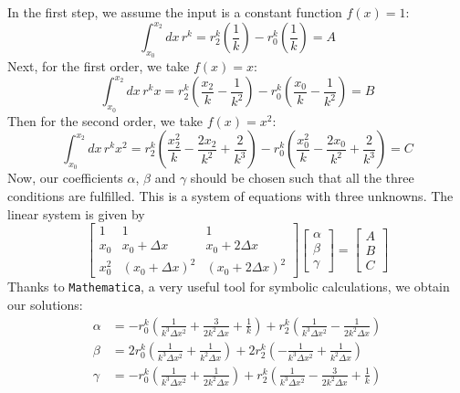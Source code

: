 In the first step, we assume the input is a constant function $f(x)=1$:
\begin{equation} \label{eq:alice}
\int_{x_0}^{x_2} dx\, r^k = r_2^k \left(\frac{1}{k}\right) - r_0^k \left(\frac{1}{k}\right) = A
\end{equation}
Next, for the first order, we take $f(x)=x$:
\begin{equation} \label{eq:bob}
\int_{x_0}^{x_2} dx\, r^k x = r_2^k\left( \frac{x_2}{k} - \frac{1}{k^2} \right) - r_0^k\left( \frac{x_0}{k} - \frac{1}{k^2} \right) = B
\end{equation}
Then for the second order, we take $f(x)=x^2$:
\begin{equation} \label{eq:chen}
\int_{x_0}^{x_2} dx\, r^k x^2 = r_2^k\left( \frac{x_2^2}{k} - \frac{2x_2}{k^2} + \frac{2}{k^3} \right) - r_0^k\left( \frac{x_0^2}{k} - \frac{2x_0}{k^2} + \frac{2}{k^3} \right) = C
\end{equation}
Now, our coefficients $\alpha$, $\beta$ and $\gamma$ should be chosen such that
all the three conditions are fulfilled. This is a system of equations with three unknowns.
The linear system is given by
\begin{equation}
\begin{bmatrix}
1 & 1 & 1 \\
x_0 & x_0+\Delta x & x_0+2\Delta x \\
x_0^2 & (x_0+\Delta x)^2 & (x_0+2\Delta x)^2
\end{bmatrix}
\begin{bmatrix}
\alpha \\
\beta \\
\gamma
\end{bmatrix} =
\begin{bmatrix}
A \\
B \\
C
\end{bmatrix}
\end{equation}
Thanks to \texttt{Mathematica}, a very useful tool for symbolic
calculations, we obtain our solutions:
\begin{align}
\alpha & = -r_0^k\left( \frac{1}{k^3\Delta x^2} + \frac{3}{2k^2\Delta x} + \frac{1}{k} \right)
           +r_2^k\left( \frac{1}{k^3\Delta x^2} - \frac{1}{2k^2\Delta x} \right) \\
\beta & =  2r_0^k\left( \frac{1}{k^3\Delta x^2} + \frac{1}{k^2\Delta x} \right)
          +2r_2^k\left(-\frac{1}{k^3\Delta x^2} + \frac{1}{k^2\Delta x} \right) \\
\gamma & = -r_0^k\left( \frac{1}{k^3\Delta x^2} + \frac{1}{2k^2\Delta x} \right)
           +r_2^k\left( \frac{1}{k^3\Delta x^2} - \frac{3}{2k^2\Delta x} + \frac{1}{k} \right)
\end{align}
